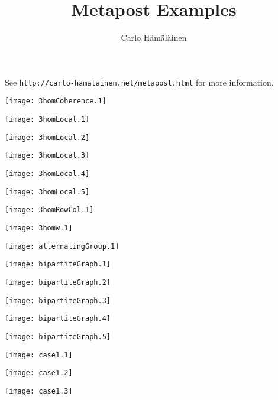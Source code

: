 \documentclass[12pt,a4paper,amstags,fleqn,reqno]{article}
\title{Metapost Examples}
\author{Carlo H\"{a}m\"{a}l\"{a}inen}
\begin{document}
\maketitle

See {\tt http://carlo-hamalainen.net/metapost.html} for more information.

\begin{center} \texttt{[image: 3homCoherence.1]} \end{center}
\begin{center} \texttt{[image: 3homLocal.1]} \end{center}
\begin{center} \texttt{[image: 3homLocal.2]} \end{center}
\begin{center} \texttt{[image: 3homLocal.3]} \end{center}
\begin{center} \texttt{[image: 3homLocal.4]} \end{center}
\begin{center} \texttt{[image: 3homLocal.5]} \end{center}
\begin{center} \texttt{[image: 3homRowCol.1]} \end{center}
\begin{center} \texttt{[image: 3homw.1]} \end{center}
\begin{center} \texttt{[image: alternatingGroup.1]} \end{center}
\begin{center} \texttt{[image: bipartiteGraph.1]} \end{center}
\begin{center} \texttt{[image: bipartiteGraph.2]} \end{center}
\begin{center} \texttt{[image: bipartiteGraph.3]} \end{center}
\begin{center} \texttt{[image: bipartiteGraph.4]} \end{center}
\begin{center} \texttt{[image: bipartiteGraph.5]} \end{center}
\begin{center} \texttt{[image: case1.1]} \end{center}
\begin{center} \texttt{[image: case1.2]} \end{center}
\begin{center} \texttt{[image: case1.3]} \end{center}
\end{document}
